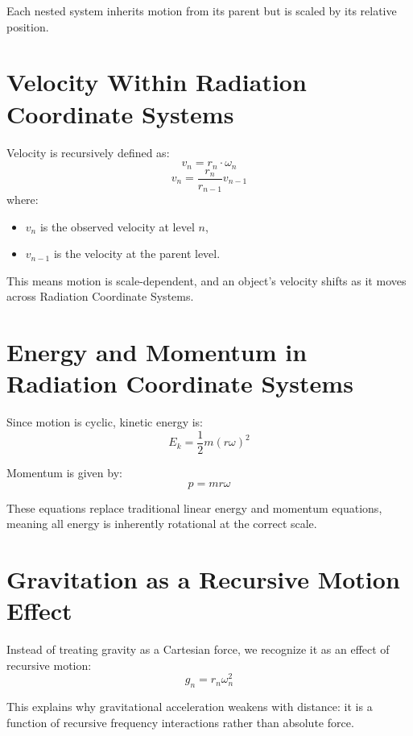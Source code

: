 \documentclass{article}
\begin{document}
Each nested system inherits motion from its parent but is scaled by its relative position.

\section{Velocity Within Radiation Coordinate Systems}
Velocity is recursively defined as:
\begin{equation}
    v_n = r_n \cdot \omega_n
\end{equation}
\begin{equation}
    v_n = \frac{r_n}{r_{n-1}} v_{n-1}
\end{equation}
where:
\begin{itemize}
    \item $v_n$ is the observed velocity at level $n$,
    \item $v_{n-1}$ is the velocity at the parent level.
\end{itemize}

This means motion is scale-dependent, and an object’s velocity shifts as it moves across Radiation Coordinate Systems.

\section{Energy and Momentum in Radiation Coordinate Systems}
Since motion is cyclic, kinetic energy is:
\begin{equation}
    E_k = \frac{1}{2} m (r \omega)^2
\end{equation}

Momentum is given by:
\begin{equation}
    p = m r \omega
\end{equation}

These equations replace traditional linear energy and momentum equations, meaning all energy is inherently rotational at the correct scale.

\section{Gravitation as a Recursive Motion Effect}
Instead of treating gravity as a Cartesian force, we recognize it as an effect of recursive motion:
\begin{equation}
    g_n = r_n \omega_n^2
\end{equation}

This explains why gravitational acceleration weakens with distance: it is a function of recursive frequency interactions rather than absolute force.
\end{document}
